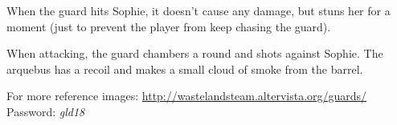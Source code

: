 When the guard hits Sophie, it doesn't cause any damage, but stuns her for a moment (just to prevent the player from keep chasing the guard).

When attacking, the guard chambers a round and shots against Sophie. The arquebus has a recoil and makes a small cloud of smoke from the barrel.

For more reference images: \url{http://wastelandsteam.altervista.org/guards/}\\
Password: \textit{gld18}
